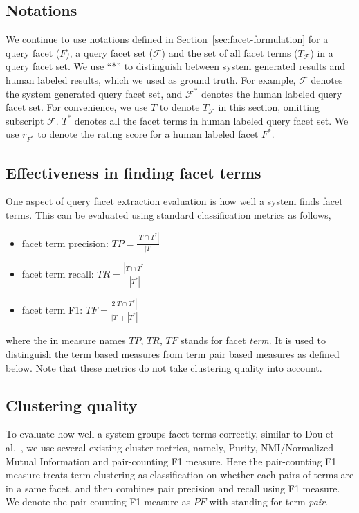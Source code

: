 \subsection{Notations} \label{sec:evalmetrics}
We continue to use notations defined in Section~\ref{sec:facet-formulation} for a query facet ($F$), a query facet set ($\mathcal{F}$) and the set of all facet terms ($T_{\mathcal{F}}$) in a query facet set. We use ``$*$'' to distinguish between system generated results and human labeled results, which we used as ground truth.
For example, $\mathcal{F}$ denotes the system generated query facet set, and $\mathcal{F}^*$ denotes the human labeled query facet set.
For convenience, we use $T$ to denote $T_{\mathcal{F}}$ in this section, omitting subscript $\mathcal{F}$.
$T^*$ denotes all the facet terms in human labeled query facet set.
We use $r_{F^*}$ to denote the rating score for a human labeled facet $F^*$.

\subsection{Effectiveness in finding facet terms}
One aspect of query facet extraction evaluation is how well a system finds facet terms. This can be evaluated using standard classification metrics as follows,
\begin{itemize}
 \item facet term precision: $T\!P=\frac{|T \cap T^*|}{|T|}$
 \item facet term recall: $T\!R=\frac{|T \cap T^*|}{|T^*|}$
 \item facet term F1: $T\!F=\frac{2|T \cap T^*|}{|T|+|T^*|}$
\end{itemize}
where the  in measure names $T\!P$, $T\!R$, $T\!F$ stands for facet \emph{term}. It is used to distinguish the term based measures from term pair based measures as defined below. Note that these metrics do not take clustering quality into account.

\subsection{Clustering quality}
\label{sec:intrinsic-clustering}
To evaluate how well a system groups facet terms correctly,
similar to Dou et al.~\cite{dou2011finding}, we use several existing cluster metrics, namely, Purity, NMI/Normalized Mutual Information and pair-counting F1 measure. Here the pair-counting F1 measure treats term clustering as classification on whether each pairs of terms are in a same facet, and then combines pair precision and recall using F1 measure. We denote the pair-counting F1 measure as $P\!F$ with  standing for term \emph{pair}.

